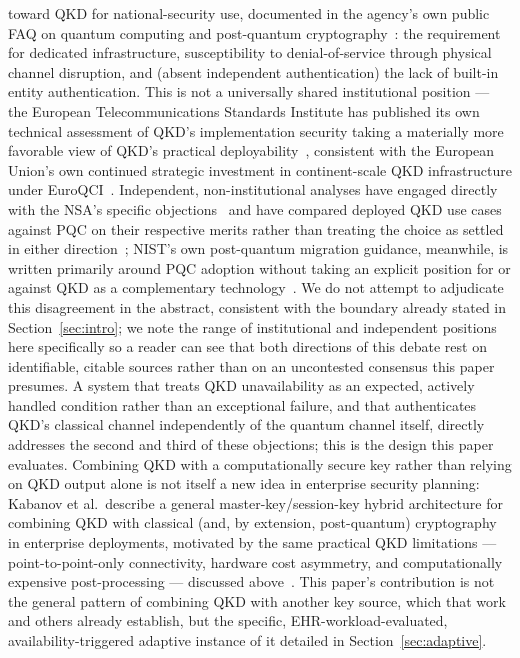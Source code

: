 \documentclass[journal]{IEEEtran}
\begin{document}
toward QKD for national-security use, documented in the agency's own public FAQ on quantum computing and post-quantum cryptography~\cite{nsa2021qkdfaq}: the requirement for dedicated infrastructure, susceptibility to denial-of-service through physical channel disruption, and (absent independent authentication) the lack of built-in entity authentication. This is not a universally shared institutional position --- the European Telecommunications Standards Institute has published its own technical assessment of QKD's implementation security taking a materially more favorable view of QKD's practical deployability~\cite{etsi2018whitepaper27}, consistent with the European Union's own continued strategic investment in continent-scale QKD infrastructure under EuroQCI~\cite{euroqci2026shield,euroqci2026sizing}. Independent, non-institutional analyses have engaged directly with the NSA's specific objections~\cite{terraquantum2023nsarebuttal} and have compared deployed QKD use cases against PQC on their respective merits rather than treating the choice as settled in either direction~\cite{qkdvspqccritical2025}; NIST's own post-quantum migration guidance, meanwhile, is written primarily around PQC adoption without taking an explicit position for or against QKD as a complementary technology~\cite{nist2023sp180038}. We do not attempt to adjudicate this disagreement in the abstract, consistent with the boundary already stated in Section~\ref{sec:intro}; we note the range of institutional and independent positions here specifically so a reader can see that both directions of this debate rest on identifiable, citable sources rather than on an uncontested consensus this paper presumes. A system that treats QKD unavailability as an expected, actively handled condition rather than an exceptional failure, and that authenticates QKD's classical channel independently of the quantum channel itself, directly addresses the second and third of these objections; this is the design this paper evaluates. Combining QKD with a computationally secure key rather than relying on QKD output alone is not itself a new idea in enterprise security planning: Kabanov et al.\ describe a general master-key/session-key hybrid architecture for combining QKD with classical (and, by extension, post-quantum) cryptography in enterprise deployments, motivated by the same practical QKD limitations --- point-to-point-only connectivity, hardware cost asymmetry, and computationally expensive post-processing --- discussed above~\cite{kabanov2018practical}. This paper's contribution is not the general pattern of combining QKD with another key source, which that work and others already establish, but the specific, EHR-workload-evaluated, availability-triggered adaptive instance of it detailed in Section~\ref{sec:adaptive}.
\end{document}
